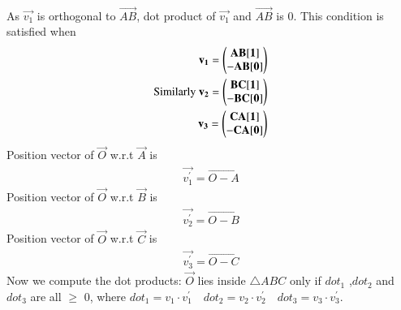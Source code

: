 \begin{enumerate}[label=\thesection.\arabic*.,ref=\thesection.\theenumi]
\begin{align}
\end{align}
As $\vec{v_1}$ is orthogonal to $\vec{AB}$, dot product of $\vec{v_1}$ and $\vec{AB}$ is 0.
This condition is satisfied when \\
\begin{align}
\mathbf{v_1}= \begin{pmatrix}\mathbf{AB[1]}\\\mathbf{-AB[0]}\end{pmatrix}\\
\text{Similarly }\mathbf{v_2}= \begin{pmatrix}\mathbf{BC[1]}\\\mathbf{-BC[0]}\end{pmatrix}\\
\mathbf{v_3}= \begin{pmatrix}\mathbf{CA[1]}\\\mathbf{-CA[0]}\end{pmatrix}
\end{align}
Position vector of $\vec{O}$ w.r.t $\vec{A}$ is 
\begin{align}
\vec{v_{1}^{'}} = \vec{O-A}
\end{align}
Position vector of $\vec{O}$ w.r.t $\vec{B}$ is
\begin{align}
 \vec{v_{2}^{'}} = \vec{O-B}
 \end{align}
Position vector of $\vec{O}$ w.r.t $\vec{C}$ is
\begin{align}
 \vec{v_{3}^{'}} = \vec{O-C}
 \end{align}
Now we compute the dot products: $\vec{O}$ lies inside $\triangle ABC$ only if $dot_1$ ,$dot_2$ and $dot_3$ are all $\geqslant$ 0, where $dot_1 = v_1 \cdot v_{1}^{'} \quad dot_2 = v_2 \cdot v_{2}^{'} \quad dot_3 = v_3 \cdot v_{3}^{'}$.






      

      

\end{enumerate}
